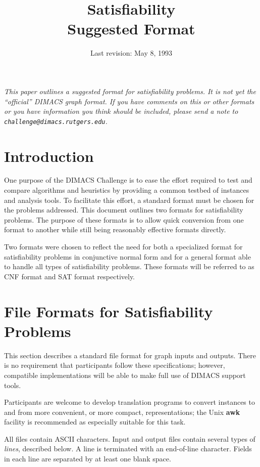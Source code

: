 \title{Satisfiability\\Suggested Format}
\author{}
\date{Last revision: May 8, 1993}

\maketitle
{\narrower\it This paper outlines a suggested format for
satisfiability problems.  It is not
yet the ``official'' DIMACS graph format.  If you have comments on
this or other formats or you have information you think should be
included, please send a note to {\tt challenge@dimacs.rutgers.edu}.}

\section{Introduction}
One purpose of the DIMACS Challenge is to ease the effort required to
test and compare algorithms and heuristics by providing a common
testbed of instances and analysis tools.  To facilitate this effort, a
standard format must be chosen for the problems addressed.  This
document outlines two formats for satisfiability problems.  The
purpose of these formats is to allow quick conversion from one format
to another while still being reasonably effective formats directly.

Two formats were chosen to reflect the need for both a specialized
format for satisfiability problems in conjunctive normal form and for
a general format able to handle all types of satisfiability problems.
These formats will be referred to as CNF format and SAT format respectively.

\section{File Formats for Satisfiability Problems} 

This section describes a standard file format for graph inputs and outputs. 
There is no  requirement that participants follow these specifications;
however, compatible implementations will be able to make full use of 
DIMACS support tools.  

Participants are welcome to develop translation programs to convert
instances to and from more convenient, or more compact, representations;
the Unix {\bf awk} facility is recommended as especially suitable
for this task.   

All files contain ASCII characters.  Input and output files contain
several types of {\em lines}, described below.  A line is terminated
with an end-of-line character.  Fields in each line are separated by
at least one blank space.  

